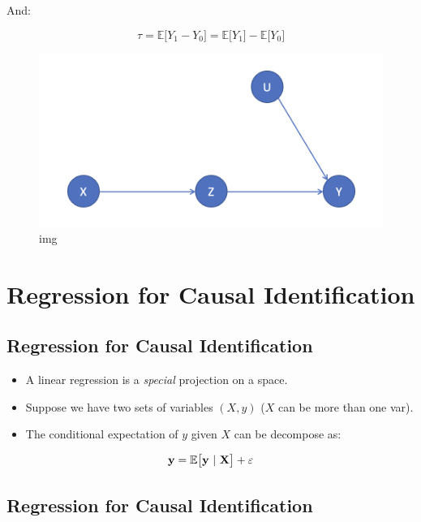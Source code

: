 \documentclass[11pt]{article}
\begin{document}
And:

\[ \tau = \mathbb{E}\big[Y_{1} - Y_{0}\big] =  \mathbb{E}\big[Y_{1}\big] -  \mathbb{E}\big[Y_{0}\big] \]

\begin{figure}
\centering
\includegraphics{../img/dag5.png}
\caption{img}
\end{figure}

    \hypertarget{regression-for-causal-identification}{%
\section{Regression for Causal
Identification}\label{regression-for-causal-identification}}

    \hypertarget{regression-for-causal-identification}{%
\subsection{Regression for Causal
Identification}\label{regression-for-causal-identification}}

\begin{itemize}
\item
  A linear regression is a \emph{special} projection on a space.
\item
  Suppose we have two sets of variables \((X, y)\) (\(X\) can be more
  than one var).
\item
  The conditional expectation of \(y\) given \(X\) can be decompose as:
\end{itemize}

\[ \bf{y} = \mathbb{E}\big[\bf{y} \ | \ \bf{X}\big] + \bf{\varepsilon} \]

    \hypertarget{regression-for-causal-identification}{%
\subsection{Regression for Causal
Identification}\label{regression-for-causal-identification}}
\end{document}
